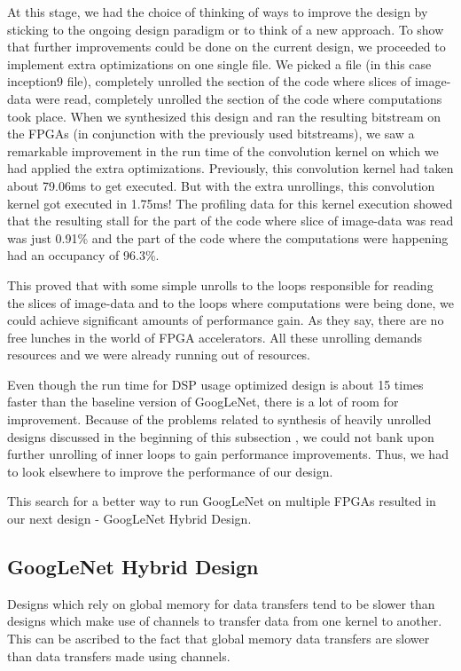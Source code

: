 At this stage, we had the choice of thinking of ways to improve the design by sticking to the ongoing design paradigm or to think of a new approach. To show that further improvements could be done on the current design, we proceeded to implement extra optimizations on one single file. We picked a file (in this case inception9 file), completely unrolled the section of the code where slices of image-data were read, completely unrolled the section of the code where computations took place. When we synthesized this design and ran the resulting bitstream on the FPGAs (in conjunction with the previously used bitstreams), we saw a remarkable improvement in the run time of the convolution kernel on which we had applied the extra optimizations. Previously, this convolution kernel had taken about 79.06ms to get executed. But with the extra unrollings, this convolution kernel got executed in 1.75ms! The profiling data for this kernel execution showed that the resulting stall for the part of the code where slice of image-data was read was just 0.91\% and the part of the code where the computations were happening had an occupancy of 96.3\%.  

This proved that with some simple unrolls to the loops responsible for reading the slices of image-data and to the loops where computations were being done, we could achieve significant amounts of performance gain. As they say, there are no free lunches in the world of FPGA accelerators. All these unrolling demands resources and we were already running out of resources.


Even though the run time for DSP usage optimized design is about 15 times faster than the baseline version of GoogLeNet, there is a lot of room for improvement. Because of the problems related to synthesis of heavily unrolled designs discussed in the beginning of this subsection , we could not bank upon further unrolling of inner loops to gain performance improvements. Thus, we had to look elsewhere to improve the performance of our design.


This search for a better way to run GoogLeNet on multiple FPGAs resulted in our next design - GoogLeNet Hybrid Design.

\subsection{GoogLeNet Hybrid Design}
Designs which rely on global memory for data transfers tend to be slower than designs which make use of channels to transfer data from one kernel to another. This can be ascribed to the fact that global memory data transfers are slower than data transfers made using channels.  

